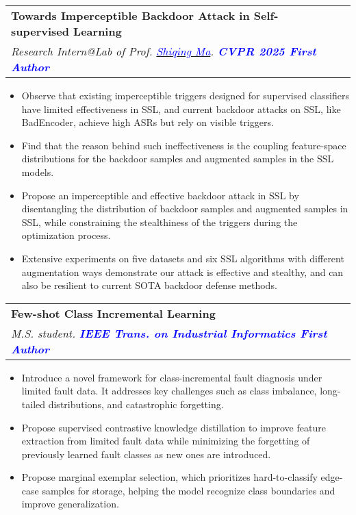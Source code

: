 \documentclass[letterpaper,11pt]{article}
\makeatletter
\newcommand{\resumeItem}[1]{
  \item\small{
    {#1 \vspace{-2pt}}
  }
}
\newcommand{\resumeSubheading}[4]{
  \vspace{-2pt}\item
    \begin{tabular*}{1.0\textwidth}[t]{l@{\extracolsep{\fill}}r}
      \textbf{#1} & \textbf{\small #2} \\
      \textit{\small#3} & \makebox[0pt][r]{\textit{\small #4}} \\

    \end{tabular*}\vspace{-10pt}
}
\newcommand{\resumeItemListStart}{\begin{itemize}}
\newcommand{\resumeItemListEnd}{\end{itemize}\vspace{-5pt}}
\makeatother
\begin{document}
    \resumeSubheading
      {Towards Imperceptible Backdoor Attack in Self-supervised Learning}{}
      {Research Intern@Lab of Prof. \href{https://people.cs.umass.edu/~shiqingma/}{\textcolor{blue}{Shiqing Ma}}. \textcolor{blue}{\textbf{CVPR 2025 First Author}}}{UMass Amherst}
      \resumeItemListStart
        \resumeItem{Observe that existing imperceptible triggers designed for supervised classifiers have limited effectiveness in SSL, and current backdoor attacks on SSL, like BadEncoder, achieve high ASRs but rely on visible triggers.}
        \resumeItem{Find that the reason behind such ineffectiveness is the coupling feature-space distributions for the backdoor samples and augmented samples in the SSL models.}
        \resumeItem{Propose an imperceptible and effective backdoor attack in SSL by disentangling the distribution of backdoor samples and augmented samples in SSL, while constraining the stealthiness of the triggers during the optimization process.}
        \resumeItem{Extensive experiments on five datasets and six SSL algorithms with different augmentation ways demonstrate our attack is effective and stealthy, and can also be resilient to current SOTA backdoor defense methods.}

      \resumeItemListEnd

    \resumeSubheading
      {Few-shot Class Incremental Learning}{}
      {M.S. student. \textcolor{blue}{\textbf{IEEE Trans. on Industrial Informatics First Author}}}{Zhejiang University}
      \resumeItemListStart
        \resumeItem{Introduce a novel framework for class-incremental fault diagnosis under limited fault data. It addresses key challenges such as class imbalance, long-tailed distributions, and catastrophic forgetting.}
        \resumeItem{Propose supervised contrastive knowledge distillation to improve feature extraction from limited fault data while minimizing the forgetting of previously learned fault classes as new ones are introduced.}
        \resumeItem{Propose marginal exemplar selection, which prioritizes hard-to-classify edge-case samples for storage, helping the model recognize class boundaries and improve generalization.}
      \resumeItemListEnd
\end{document}

